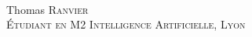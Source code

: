 
~

\parbox[top][0.09\textheight][c]{\linewidth}{
	\centering
    {\sffamily\Huge Thomas \textsc{Ranvier}}\\\medskip
    {\LARGE\color{headings}\textsc{Étudiant en M2 Intelligence Artificielle, \textsc{Lyon}}}
}
